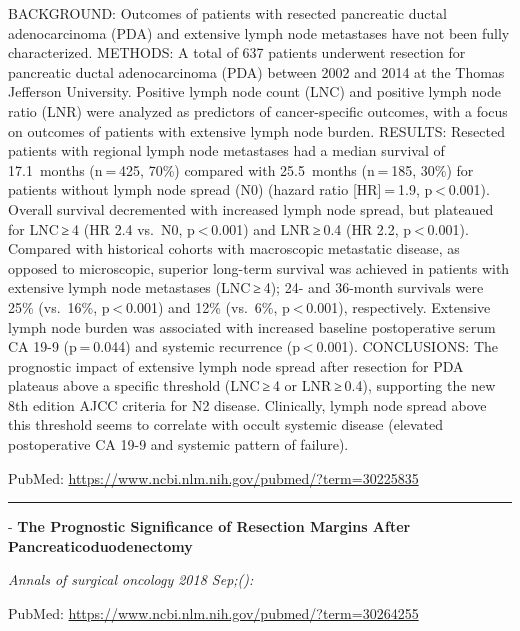 \documentclass[]{article}
\begin{document}
BACKGROUND: Outcomes of patients with resected pancreatic ductal
adenocarcinoma (PDA) and extensive lymph node metastases have not been
fully characterized. METHODS: A total of 637 patients underwent
resection for pancreatic ductal adenocarcinoma (PDA) between 2002 and
2014 at the Thomas Jefferson University. Positive lymph node count (LNC)
and positive lymph node ratio (LNR) were analyzed as predictors of
cancer-specific outcomes, with a focus on outcomes of patients with
extensive lymph node burden. RESULTS: Resected patients with regional
lymph node metastases had a median survival of 17.1~months (n = 425,
70\%) compared with 25.5~months (n = 185, 30\%) for patients without
lymph node spread (N0) (hazard ratio {[}HR{]} = 1.9,
p \textless{} 0.001). Overall survival decremented with increased lymph
node spread, but plateaued for LNC ≥ 4 (HR 2.4 vs.~N0,
p \textless{} 0.001) and LNR ≥ 0.4 (HR 2.2, p \textless{} 0.001).
Compared with historical cohorts with macroscopic metastatic disease, as
opposed to microscopic, superior long-term survival was achieved in
patients with extensive lymph node metastases (LNC ≥ 4); 24- and
36-month survivals were 25\% (vs.~16\%, p \textless{} 0.001) and 12\%
(vs.~6\%, p \textless{} 0.001), respectively. Extensive lymph node
burden was associated with increased baseline postoperative serum CA
19-9 (p = 0.044) and systemic recurrence (p \textless{} 0.001).
CONCLUSIONS: The prognostic impact of extensive lymph node spread after
resection for PDA plateaus above a specific threshold (LNC ≥ 4 or
LNR ≥ 0.4), supporting the new 8th edition AJCC criteria for N2 disease.
Clinically, lymph node spread above this threshold seems to correlate
with occult systemic disease (elevated postoperative CA 19-9 and
systemic pattern of failure).

PubMed: \url{https://www.ncbi.nlm.nih.gov/pubmed/?term=30225835}

{}

{}

\begin{center}\rule{0.5\linewidth}{\linethickness}\end{center}

 - \textbf{The Prognostic Significance of Resection Margins After
Pancreaticoduodenectomy}

\emph{Annals of surgical oncology 2018 Sep;():}

PubMed: \url{https://www.ncbi.nlm.nih.gov/pubmed/?term=30264255}

{}

{}
\end{document}

